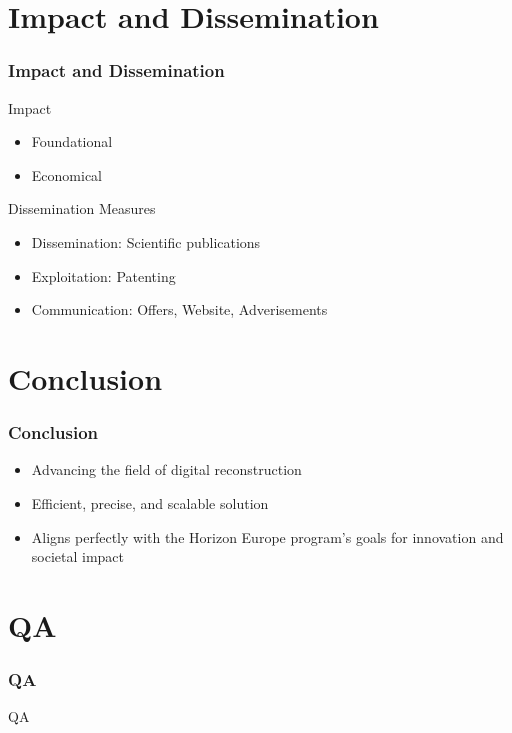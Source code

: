 \documentclass{beamer}
\begin{document}
\section{Impact and Dissemination}
\begin{frame}
\frametitle{Impact and Dissemination}
    Impact
    \begin{itemize}
        \item Foundational
        \item Economical
    \end{itemize}
    Dissemination Measures
    \begin{itemize}
        \item Dissemination: Scientific publications
        \item Exploitation: Patenting
        \item Communication: Offers, Website, Adverisements
    \end{itemize}
\end{frame}

\section{Conclusion}
\begin{frame}
\frametitle{Conclusion}
\begin{itemize}
     \item Advancing the field of digital reconstruction
     \item Efficient, precise, and scalable solution
     \item Aligns perfectly with the Horizon Europe program’s goals for innovation and societal impact
\end{itemize}
\end{frame}

\section{QA}
\begin{frame}
\frametitle{QA}
QA
\end{frame}
\end{document}
